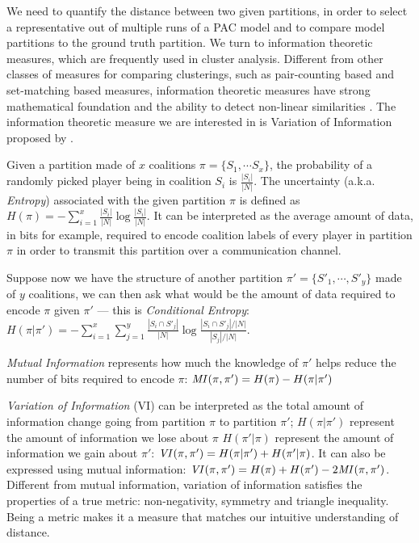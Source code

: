 We need to quantify the distance between two given partitions, in order
to select a representative out of multiple runs of a PAC model and to compare
model partitions to the ground truth partition.
We turn to information theoretic measures, which are frequently used in cluster
analysis.
Different from other classes of measures for comparing clusterings, such as
pair-counting based and set-matching based measures, information theoretic
measures have strong mathematical foundation and the ability to detect
non-linear similarities \cite{Vinh:2010:ITM:1756006.1953024}.
The information theoretic measure we are interested in is Variation of
Information proposed by .

Given a partition made of $x$ coalitions $\pi = \{S_1, \cdots S_x\}$, the
probability of a randomly picked player being in coalition $S_i$ is
$\frac{|S_i|}{|N|}$.
The uncertainty (a.k.a. \textit{Entropy}) associated with the given partition
$\pi$ is defined as
$H(\pi) = - \sum^x_{i=1} \frac{|S_i|}{|N|} \log{\frac{|S_i|}{|N|}}$.
It can be interpreted as the average amount of data, in bits for example,
required to encode coalition labels of every player in partition $\pi$ in order
to transmit this partition over a communication channel.

Suppose now we have the structure of another partition 
$\pi' = \{S'_1, \cdots, S'_y\}$ made of $y$ coalitions, we can then ask what
would be the amount of data required to encode $\pi$ given $\pi'$ 
--- this is \textit{Conditional Entropy}:
$H(\pi|\pi') = - \sum^x_{i=1} \sum^y_{j=1} \frac{|S_i \cap S'_j|}{|N|} \log{\frac{|S_i \cap S'_j|/|N|}{|S_j|/|N|}}$.

\textit{Mutual Information} represents how much the knowledge of $\pi'$ helps
reduce the number of bits required to encode $\pi$:
$\mathit{MI}(\pi, \pi') = H(\pi) - H(\pi|\pi')$

\textit{Variation of Information} (VI) can be interpreted as the total amount of
information change going from partition $\pi$ to partition $\pi'$;
$H(\pi|\pi')$ represent the amount of information we lose about $\pi$
$H(\pi'|\pi)$ represent the amount of information we gain about $\pi'$:
$\mathit{VI}(\pi, \pi') = H(\pi|\pi') + H(\pi'|\pi)$.
It can also be expressed using mutual information:
$\mathit{VI}(\pi, \pi') = H(\pi) + H(\pi') - 2\mathit{MI}(\pi, \pi')$.
Different from mutual information, variation of information satisfies the
properties of a true metric: non-negativity, symmetry and triangle inequality.
Being a metric makes it a measure that matches our intuitive understanding of
distance.


